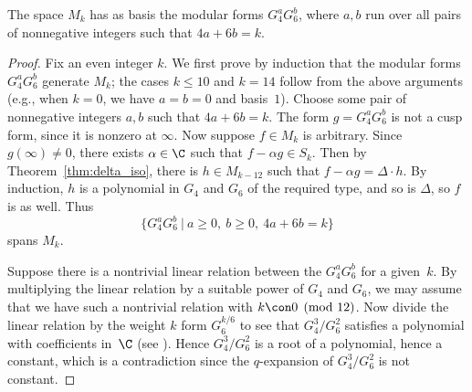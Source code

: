 \begin{theorem}\label{thm:mk_one_basis}
The space $M_k$ has as basis the
modular forms $G_4^a G_6^b$, where $a,b$
run over all pairs of nonnegative integers such that 
$4a+6b=k$.
\end{theorem}
\begin{proof}
  Fix an even integer $k$.  We first prove by induction that the
  modular forms $G_4^a G_6^b$ generate $M_k$; the cases $k\leq 10$ and
  $k=14$ follow from the above arguments (e.g., when $k=0$, we have $a=b=0$ and
  basis~$1$).  Choose some pair of nonnegative integers $a,b$ 
  such that $4a+6b=k$.   The form
  $g=G_4^a G_6^b$ is not a cusp form, since it is nonzero at $\infty$.
  Now suppose $f\in M_k$ is arbitrary.  Since $g(\infty)\neq 0$, there
  exists $\alpha\in\C$ such that $f - \alpha g \in S_k$.  Then by
  Theorem~\ref{thm:delta_iso}, there is $h \in M_{k-12}$ such that $f
  - \alpha g = \Delta \cdot h$.  By induction, $h$ is a polynomial in
  $G_4$ and $G_6$ of the required type, and so is $\Delta$, so $f$ is
  as well.  Thus $$\{G_4^aG_6^b\ |\ a\geq 0,\ b\geq 0,\ 4a+6b=k\}$$
  spans $M_k$.

Suppose there is a nontrivial linear relation between the $G_4^a
G_6^b$ for a given~$k$.  By multiplying the linear relation by a
suitable power of $G_4$ and $G_6$, we may assume that we have
such a nontrivial relation with $k\con 0\pmod{12}$.  Now divide the
linear relation by the weight $k$ form $G_6^{k/6}$ to see that
$G_4^3/G_6^2$ satisfies a polynomial with coefficients in~$\C$
(see ).  Hence
$G_4^3/G_6^2$ is a root of a polynomial, hence a constant, which is a
contradiction since the $q$-expansion of $G_4^3/G_6^2$ is not
constant.  
\end{proof}

